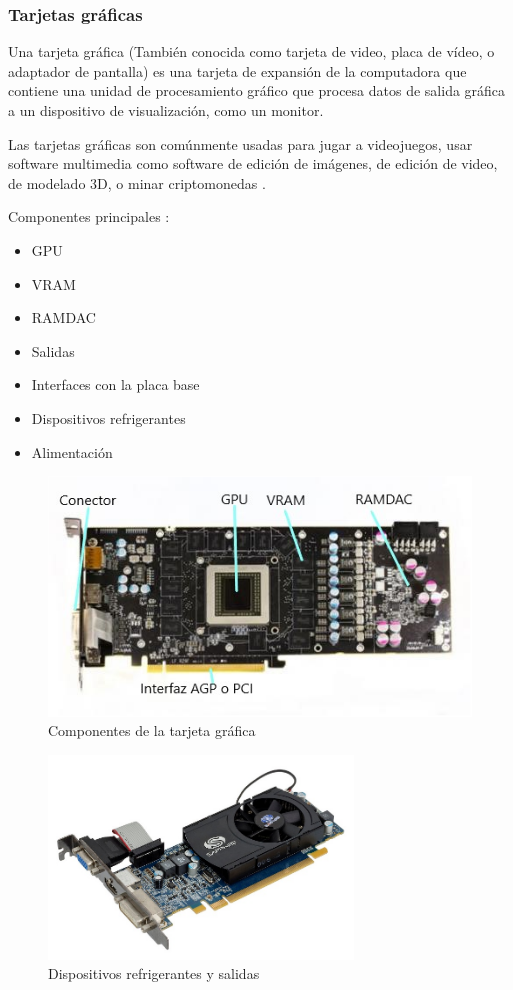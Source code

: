\subsubsection{Tarjetas gráficas}

Una tarjeta gráfica (También conocida como tarjeta de video, placa de vídeo, o adaptador de pantalla) es una tarjeta de expansión de la computadora que contiene una unidad de procesamiento gráfico que procesa datos de salida gráfica a un dispositivo de visualización, como un monitor.

Las tarjetas gráficas son comúnmente usadas para jugar a videojuegos, usar software multimedia como software de edición de imágenes, de edición de video, de modelado 3D, o minar criptomonedas \cite{wikitarjetagrafica}.

Componentes principales \cite{juanpblogs}:

\begin{itemize}
  \item GPU
  \item VRAM
  \item RAMDAC
  \item Salidas
  \item Interfaces con la placa base
  \item Dispositivos refrigerantes
  \item Alimentación
\end{itemize}

\begin{figure}[H]
  \centering
  \includegraphics[scale=0.8]{imagenes/componentes-tarjeta.png}
  \caption{Componentes de la tarjeta gráfica}
\end{figure}

\begin{figure}[H]
  \centering
  \includegraphics[scale=0.9]{imagenes/dispositivos-refrigerante.png}
  \caption{Dispositivos refrigerantes y salidas}
\end{figure}

